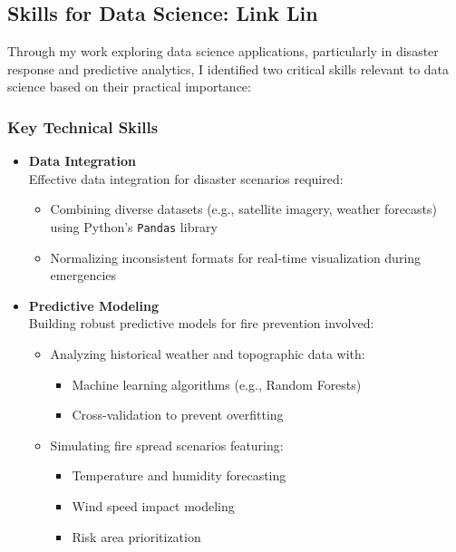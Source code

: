 \documentclass[a4paper, 11pt]{report}
\begin{document}
\subsection*{Skills for Data Science: Link Lin}

Through my work exploring data science applications, particularly in disaster response and predictive analytics, I identified two critical skills relevant to data science based on their practical importance:

\subsubsection*{Key Technical Skills}
\begin{itemize}
    \item \textbf{Data Integration} \\
    Effective data integration for disaster scenarios required:
    \begin{itemize}
        \item Combining diverse datasets (e.g., satellite imagery, weather forecasts) using Python's \texttt{Pandas} library
        \item Normalizing inconsistent formats for real-time visualization during emergencies
    \end{itemize}

    \item \textbf{Predictive Modeling} \\
    Building robust predictive models for fire prevention involved:
    \begin{itemize}
        \item Analyzing historical weather and topographic data with:
        \begin{itemize}
            \item Machine learning algorithms (e.g., Random Forests)
            \item Cross-validation to prevent overfitting
        \end{itemize}
        \item Simulating fire spread scenarios featuring:
        \begin{itemize}
            \item Temperature and humidity forecasting
            \item Wind speed impact modeling
            \item Risk area prioritization
        \end{itemize}
    \end{itemize}
\end{itemize}
\newpage
\end{document}
